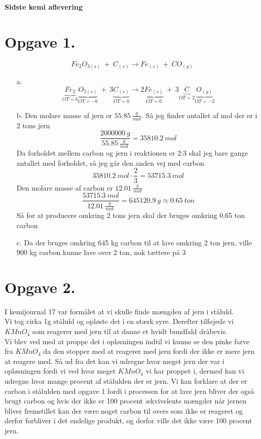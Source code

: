 \documentclass[12pt]{article}
\begin{document}
\Large{\textbf{Sidste kemi aflevering}}
\normalsize

\section*{Opgave 1.}
$$Fe_2O_{3(s)} \ + \ C_{(s)} \rightarrow Fe_{(s)} \ + \ CO_{(g)}$$
\begin{enumerate}
  \item[a.] $$\underbrace{Fe_2}_{OT=6} \underbrace{O_{3(s)}}_{OT=-6} \ + \
  3 \underbrace{C_{(s)}}_{OT=0} \rightarrow 2 \underbrace{Fe_{(s)}}_{OT=0} \ + \
  3 \underbrace{C}_{OT=2}\underbrace{O_{(g)}}_{OT=-2}$$

  \item[b.] Den molare masse af jern er $55.85 \ \frac{g}{mol}$. Så jeg finder antallet af mol der er i 2 tons jern
  $$\frac{2000000 \ g}{55.85 \ \frac{g}{mol}}=35810.2 \ mol$$
  Da forholdet mellem carbon og jern i reaktionen er 2:3 skal jeg bare gange antallet med forholdet, så jeg går den anden vej med carbon
  $$35810.2 \ mol \cdot \frac{2}{3}=53715.3 \ mol$$
  Den molare masse af carbon er $12.01 \ \frac{g}{mol}$
  $$\frac{53715.3 \ mol}{12.01 \ \frac{g}{mol}}=645120.9 \ g \approx 0.65 \ ton$$
  Så for at producere omkring 2 tons jern skal der bruges omkring 0.65 ton carbon

  \item[c.] Da der bruges omkring 645 kg carbon til at lave omkring 2 ton jern, ville 900 kg carbon kunne lave over 2 ton, nok tættere på 3
\end{enumerate}

\section*{Opgave 2.}
I kemijournal 17 var formålet at vi skulle finde mængden af jern i ståluld.\\
Vi tog cirka 1g ståluld og opløste det i en stærk syre. Derefter tilføjede vi $KMnO_4$ som reagerer med jern til at danne et hvidt bundfald dråbevis.\\
Vi blev ved med at proppe det i opløsningen indtil vi kunne se den pinke farve fra $KMnO_4$ da den stopper med at reagerer med jern fordi der ikke er
mere jern at reagere med. Så ud fra det kan vi udregne hvor meget jern der var i opløsningen fordi vi ved hvor meget $KMnO_4$ vi har proppet i, dermed kan
vi udregne hvor mange procent af stålulden der er jern. Vi kan forklare at der er carbon i stålulden med opgave 1 fordi i processen for at lave jern bliver
der også brugt carbon og hvis der ikke er 100 procent ækvivelente mængder når jernen bliver fremstillet kan der være noget carbon til overs som ikke er
reageret og derfor forbliver i det endelige produkt, og derfor ville det ikke være 100 procent jern.
\end{document}
